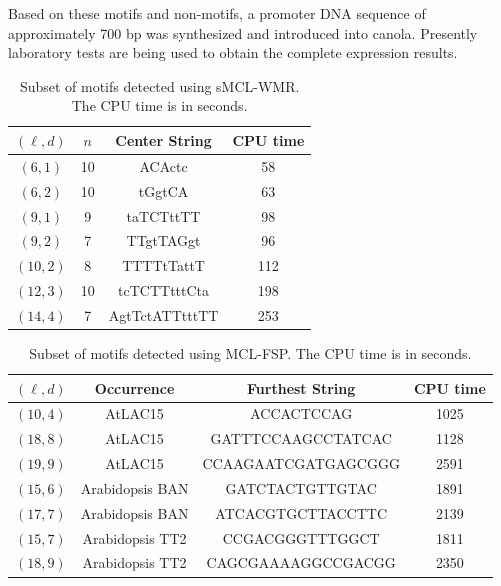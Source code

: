 Based on these motifs and non-motifs, a promoter DNA sequence of approximately 700 bp was synthesized and introduced into canola.  Presently laboratory tests are being used to obtain the complete expression results.
     

\begin{table}[h!]
\begin{center} {
\begin{tabular}{|c|c|c|c|}     
\hline	
$(\ell, d)$ & $n$ 		& Center String		& CPU time \\		
\hline
\hline
$(6, 1)$	& 10 									& ACActc					& 58 \\
$(6, 2)$	& 10 									& tGgtCA					& 63 \\
$(9, 1)$	&	9 										& taTCTttTT				& 98 \\
$(9, 2)$	&	7 										& TTgtTAGgt			& 96 \\
$(10, 2)$	&	8 										& TTTTtTattT			& 112 \\
$(12, 3)$	&	10 									& tcTCTTtttCta			& 198 \\
$(14, 4)$	&	7 									 	& AgtTctATTtttTT			& 253 \\
 \hline
	\end{tabular}}
	\end{center}
	\caption[Subset of motifs detected using sMCL-WMR.]{Subset of motifs detected using sMCL-WMR. The CPU time is in seconds.}
\label{table:detected_motifs}
\end{table}

\begin{table}[h!]
\begin{center} {
\begin{tabular}{|c|c|c|c|}     
\hline	
$(\ell, d)$ & Occurrence 		& Furthest String		& CPU time \\		
\hline
\hline
$(10,4)$	& AtLAC15			& ACCACTCCAG						& 1025 \\
$(18, 8)$	& AtLAC15			& GATTTCCAAGCCTATCAC		& 1128 \\
$(19, 9)$ 	& AtLAC15			& CCAAGAATCGATGAGCGGG	& 2591 \\
$(15, 6)$	& Arabidopsis BAN & GATCTACTGTTGTAC			& 1891 \\
$(17, 7)$  & Arabidopsis BAN & ATCACGTGCTTACCTTC		& 2139 \\
$(15,7)$	& Arabidopsis TT2 & CCGACGGGTTTGGCT 			& 1811 \\
$(18,9)$ 	& Arabidopsis TT2 & CAGCGAAAAGGCCGACGG	& 2350\\
 \hline
	\end{tabular}}
	\end{center}
	\caption[Subset of motifs detected using MCL-FSP.]{Subset of motifs detected using MCL-FSP. The CPU time is in seconds.}
\label{table:detected_nonmotifs}
\end{table}



